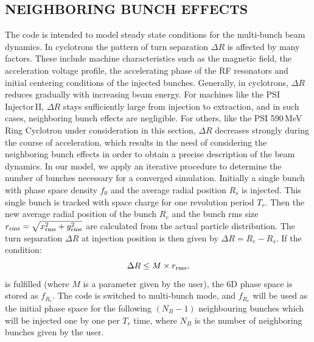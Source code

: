 \documentclass[aps,prstab,onecolumn,superscriptaddress,showpacs]{revtex4}
\begin{document}
\subsection{NEIGHBORING BUNCH EFFECTS} \label{sec:nbe}
The code is intended to model steady state conditions for the multi-bunch beam dynamics.
In cyclotrons the pattern of turn separation $\Delta R$ is affected by many factors. These include machine characteristics such as the magnetic field, 
the acceleration voltage profile, the accelerating phase of the RF resonators  and initial centering conditions of the injected bunches. 
Generally, in cyclotrons, $\Delta R$ reduces gradually  with increasing beam energy.
For machines like the PSI Injector\,II, $\Delta R$ stays sufficiently large from injection to extraction, and in such cases,  neighboring bunch effects are negligible. 
For others, like the PSI 590\,MeV Ring Cyclotron under consideration in this section, $\Delta R$ decreases strongly during the course of acceleration, 
which results in the need of considering the neighboring bunch effects in order to obtain a precise description of the beam dynamics.
In our model, we apply an iterative procedure to determine the number of bunches necessary for a converged simulation. 
Initially a single bunch with phase space density $f_0$ and the average radial position $R_s$ is injected.  
This single bunch is tracked with space charge for one revolution period $T_{r}$. 
Then the new average radial position of the bunch $R_e$ and the bunch rms size $r_{\RM{rms}}=\sqrt{x_{\RM{rms}}^{2}+y_{\RM{rms}}^2}$ 
are calculated from the actual particle distribution. The turn separation $\Delta R$ at injection position is then given by $\Delta R = R_e - R_s$. If the condition:
\begin{equation}\label{eq:dR}
  \Delta R  \le M \times r_{\RM{rms}},
\end{equation}
is fulfilled (where $M$ is a parameter given by the user), the 6D phase space is stored as $f_{R_{e}}$. 
The code is switched to multi-bunch mode, and  $f_{R_{e}}$ will be used as the initial phase space for the following $(N_B-1)$
neighbouring bunches which will be injected one by one per $T_{r}$ time, 
where $N_B$ is the number of neighboring bunches given by the user. 
\end{document}
